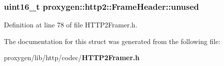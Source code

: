 \subsubsection[{unused}]{\setlength{\rightskip}{0pt plus 5cm}uint16\+\_\+t proxygen\+::http2\+::\+Frame\+Header\+::unused}\label{structproxygen_1_1http2_1_1FrameHeader_aeaebfec487f59f3f4f8489c1c4a8fed5}


Definition at line 78 of file H\+T\+T\+P2\+Framer.\+h.



The documentation for this struct was generated from the following file\+:\begin{DoxyCompactItemize}
\item 
proxygen/lib/http/codec/{\bf H\+T\+T\+P2\+Framer.\+h}\end{DoxyCompactItemize}
